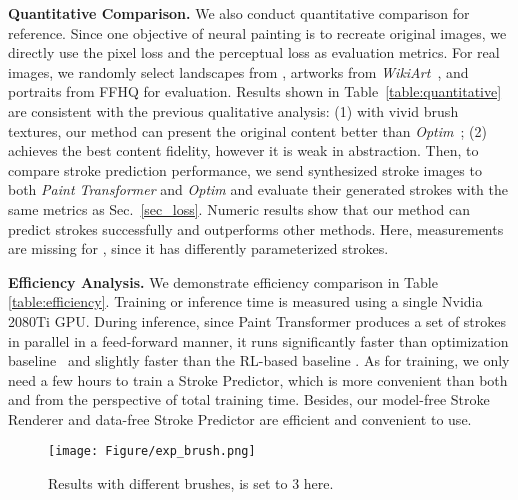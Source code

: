 \documentclass[10pt,twocolumn,letterpaper]{article}
\begin{document}
\noindent
\textbf{Quantitative Comparison.}
We also conduct quantitative comparison for reference. 
Since one objective of neural painting is to recreate original images, we directly use the pixel loss  and the perceptual loss  \cite{johnson2016perceptual} as evaluation metrics.
For real images, we randomly select  landscapes from \cite{arnaud58},  artworks from \textit{WikiArt}~\cite{phillips2011wiki}, and  portraits from FFHQ \cite{karras2019stylebased} for evaluation. 
Results shown in Table~\ref{table:quantitative} are consistent with the previous qualitative analysis: (1) with vivid brush textures, our method can present the original content better than \emph{Optim}~\cite{zou2020stylized}; (2) \cite{huang2019learning} achieves the best content fidelity, however it is weak in abstraction.
Then, to compare stroke prediction performance, we send synthesized stroke images to both \emph{Paint Transformer} and \emph{Optim} and evaluate their generated strokes with the same metrics as Sec.~\ref{sec_loss}.
Numeric results show that our method can predict strokes successfully and outperforms other methods. 
Here, measurements are missing for \cite{huang2019learning}, since it has differently parameterized strokes.


\noindent
\textbf{Efficiency Analysis.}
We demonstrate efficiency comparison in Table \ref{table:efficiency}.
Training or inference time is measured using a single Nvidia 2080Ti GPU.
During inference, since Paint Transformer produces a set of strokes in parallel in a feed-forward manner, it runs significantly faster than optimization baseline~\cite{zou2020stylized} and slightly faster than the RL-based baseline \cite{huang2019learning}.
As for training, we only need a few hours to train a Stroke Predictor, which is more convenient than both \cite{huang2019learning} and \cite{zou2020stylized} from the perspective of total training time.
Besides, our model-free Stroke Renderer and data-free Stroke Predictor are efficient and convenient to use.

\begin{figure}[t]
\begin{center}
\texttt{[image: Figure/exp\_brush.png]}
\end{center}
\vspace{-0.5cm}
   \caption{Results with different brushes,  is set to 3 here.}
\label{fig:change_stroke}
\vspace{-0.5cm}
\end{figure}
\end{document}
